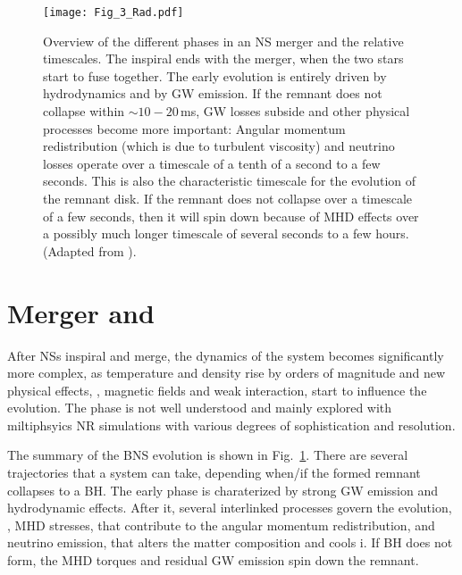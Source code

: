\begin{figure}[t]
    \centering
    \texttt{[image: Fig\_3\_Rad.pdf]}
    \caption{
        Overview of the different phases in an \ac{NS} merger and the relative timescales. 
        The inspiral ends with the merger, when the two stars start to fuse together. 
        The early \pmerg{} evolution is entirely driven by hydrodynamics and by \ac{GW} emission. 
        If the remnant does not collapse within ${\sim}10-20\,$ms, \ac{GW} losses
        subside and other physical processes become more important: 
        Angular momentum redistribution (which is due to turbulent viscosity) 
        and neutrino losses operate over a timescale of a tenth of a second to a few
        seconds. This is also the characteristic timescale for the evolution of the remnant disk. 
        If the remnant does not collapse over a timescale of a few seconds, then it will 
        spin down because of \ac{MHD} effects over a possibly much longer timescale 
        of several seconds to a few hours. 
        (Adapted from \citet{Radice:2020ddv}).
    }
    \label{fig:intro:RadFig1}
\end{figure}


\section{Merger and \pmerg{}}\label{sec:intro:merg_pmerg} %

After \acp{NS} inspiral and merge, the dynamics of the system becomes significantly 
more complex, as temperature and density rise by orders of magnitude and new 
physical effects, \eg, magnetic fields and weak interaction, start to influence the evolution. 
The \pmerg{} phase is not well understood and mainly explored with miltiphsyics \ac{NR} 
simulations with various degrees of sophistication and resolution. 

The summary of the \ac{BNS} \pmerg{} evolution is shown in Fig.~\ref{fig:intro:RadFig1}. 
There are several trajectories that a system can take, depending when/if the formed remnant 
collapses to a \ac{BH}. The early \pmerg{} phase is charaterized by strong \ac{GW} 
emission and hydrodynamic effects. After it, several interlinked processes govern the 
evolution, \eg, \ac{MHD} stresses, that contribute to the angular momentum  redistribution, 
and neutrino emission, that alters the matter composition and cools i.
If \ac{BH} does not form, the \ac{MHD} torques and residual \ac{GW} emission spin down 
the remnant.


